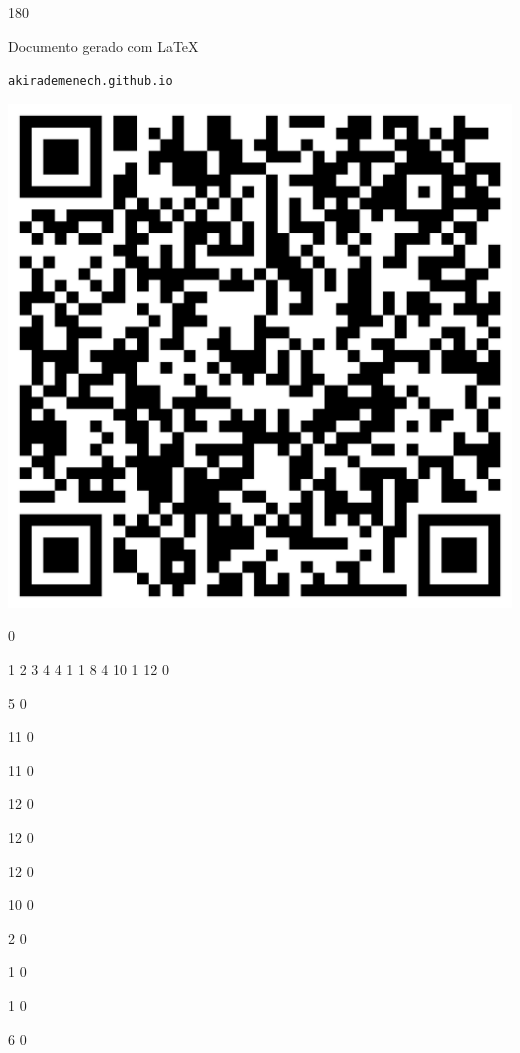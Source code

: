 \documentclass[12pt]{article}
\begin{document}
	\begin{turn}{180}	
		\begin{minipage}{\textwidth}		  
		  Documento gerado com \LaTeX			
		  
		  \texttt{akirademenech.github.io}

		  \includegraphics[height=0.3\textheight]{2e-2.pdf}

		\end{minipage}	
	\end{turn}  
		  
		\vfill  
		  
{
	0	%

	1	%
	2	%
	3	%
	4	%
	4	%
	1	%
	1	%
	8	%
	4	%
	10	%
	1	%
	12	%
	0	%

	5	%
	0	%

	11	%
	0	%

	11	%
	0	%

	12	%
	0	%

	12	%
	0	%

	12	%
	0	%

	10	%
	0	%

	2	%
	0	%

	1	%
	0	%

	1	%
	0	%

	6	%
	0	%

}	  
		    	
\end{document}
